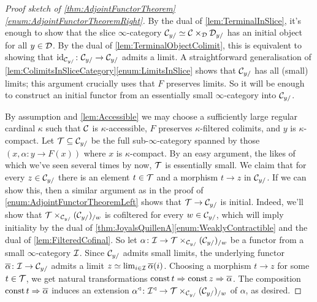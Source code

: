 \begin{proof}[Proof sketch of \cref{thm:AdjointFunctorTheorem}\cref{enum:AdjointFunctorTheoremRight}]
	By the dual of \cref{lem:TerminalInSlice}, it's enough to show that the slice $\infty$-category $\mathcal{C}_{y/}\simeq \mathcal{C}\times_{\mathcal{D}}\mathcal{D}_{y/}$ has an initial object for all $y\in\mathcal{D}$. By the dual of \cref{lem:TerminalObjectColimit}, this is equivalent to showing that $\operatorname{id}_{\mathcal{C}_{y/}}\colon \mathcal{C}_{y/}\rightarrow\mathcal{C}_{y/}$ admits a limit. A straightforward generalisation of \cref{lem:ColimitsInSliceCategory}\cref{enum:LimitsInSlice} shows that $\mathcal{C}_{y/}$ has all (small) limits; this argument crucially uses that $F$ preserves limits. So it will be enough to construct an initial functor from an essentially small $\infty$-category into $\mathcal{C}_{y/}$.
	
	By assumption and \cref{lem:Accessible} we may choose a sufficiently large regular cardinal $\kappa$ such that $\mathcal{C}$ is $\kappa$-accessible, $F$ preserves $\kappa$-filtered colimits, and $y$ is $\kappa$-compact. Let $\mathcal{T}\subseteq\mathcal{C}_{y/}$ be the full sub-$\infty$-category spanned by those $(x, \alpha\colon y\rightarrow F(x))$ where $x$ is $\kappa$-compact. By an easy argument, the likes of which we've seen several times by now, $\mathcal{T}$ is essentially small. We claim that for every $z\in \mathcal{C}_{y/}$ there is an element $t\in \mathcal{T}$ and a morphism $t\rightarrow z$ in $\mathcal{C}_{y/}$. If we can show this, then a similar argument as in the proof of \cref{enum:AdjointFunctorTheoremLeft} shows that $\mathcal{T}\rightarrow\mathcal{C}_{y/}$ is initial. Indeed, we'll show that $\mathcal{T}\times_{\mathcal{C}_{y/}}(\mathcal{C}_{y/})_{/w}$ is cofiltered for every $w\in \mathcal{C}_{y/}$, which will imply initiality by the dual of \cref{thm:JoyalsQuillenA}\cref{enum:WeaklyContractible} and the dual of \cref{lem:FilteredCofinal}. So let $\alpha\colon \mathcal{I}\rightarrow \mathcal{T}\times_{\mathcal{C}_{y/}}(\mathcal{C}_{y/})_{/w}$ be a functor from a small $\infty$-category $\mathcal{I}$. Since $\mathcal{C}_{y/}$ admits small limits, the underlying functor $\ov\alpha\colon \Ii\rightarrow \Cc_{y/}$ admits a limit $z\simeq \limit_{i\in\Ii}\ov\alpha(i)$. Choosing a morphism $t\rightarrow z$ for some $t\in \mathcal{T}$, we get natural transformations $\const t\Rightarrow\const z\Rightarrow\ov\alpha$. The composition $\const t\Rightarrow \ov\alpha$ induces an extension $\alpha^\triangleleft\colon \mathcal{I}^\triangleleft\rightarrow \mathcal{T}\times_{\mathcal{C}_{y/}}(\mathcal{C}_{y/})_{/w}$ of $\alpha$, as desired.
	

\end{proof}
